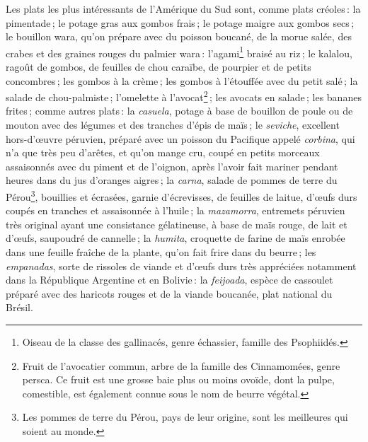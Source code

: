 Les plats les plus intéressants de l'Amérique du Sud sont, comme plats
créoles : la pimentade ; le potage gras aux gombos frais ; le potage maigre aux
gombos secs ; le bouillon wara, qu'on prépare avec du poisson boucané, de la
morue salée, des crabes et des graines rouges du palmier wara :
l'agami\footnote{Oiseau de la classe des gallinacés, genre échassier, famille
des Psophiidés.} braisé au riz ; le kalalou, ragoût de gombos, de feuilles de
chou caraïbe, de pourpier et de petits concombres ; les gombos à la crème ; les
gombos à l’étouffée avec du petit salé ; la salade de chou-palmiste ;
l’omelette à l'avocat\footnote{Fruit de l'avocatier commun, arbre de la famille
des Cinnamomées, genre persca. Ce fruit est une grosse baie plus ou moins
ovoïde, dont la pulpe, comestible, est également connue sous le nom de beurre
végétal.} ; les avocats en salade ; les bananes frites ; comme autres plats :
la \textit{casuela}, potage à base de bouillon de poule ou de mouton avec des
légumes et des tranches d'épis de maïs ; le \textit{seviche}, excellent
hors-d'œuvre péruvien, préparé avec un poisson du Pacifique appelé
\textit{corbina}, qui n'a que très peu d'arêtes, et qu'on mange cru, coupé en
petits morceaux assaisonnés avec du piment et de l'oignon, après l'avoir fait
mariner pendant {\mmm} heures dans du jus d'oranges aigres ; la
\textit{carna}, salade de pommes de terre du Pérou\footnote{Les pommes de terre
du Pérou, pays de leur origine, sont les meilleures qui soient au monde.},
bouillies et écrasées, garnie d'écrevisses, de feuilles de laitue, d'œufs durs
coupés en tranches et assaisonnée à l'huile ; la \textit{mazamorra}, entremets
péruvien très original ayant une consistance gélatineuse, à base de maïs rouge,
de lait et d'œufs, saupoudré de cannelle ; la \textit{humita}, croquette de
farine de maïs enrobée dans une feuille fraîche de la plante, qu'on fait frire
dans du beurre ; les \textit{empanadas}, sorte de rissoles de viande et d'œufs
durs très appréciées notamment dans la République Argentine et en Bolivie : la
\textit{feijoada}, espèce de cassoulet préparé avec des haricots rouges et de
la viande boucanée, plat national du Brésil.

